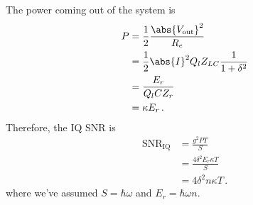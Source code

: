 The power coming out of the system is
\begin{align}
  P
  &= \frac{1}{2} \frac{\abs{V_\text{out}}^2}{R_e} \nonumber \\
  &= \frac{1}{2} \abs{I}^2 Q_l Z_{LC} \frac{1}{1 + \delta^2} \nonumber \\
  &= \frac{E_r}{Q_l C Z_r} \nonumber \\
  &= \kappa E_r \, .
\end{align}
Therefore, the IQ SNR is
\begin{align}
  \text{SNR}_\text{IQ}
  &= \frac{g^2 PT}{S} \nonumber \\
  &= \frac{4 \delta^2 E_r \kappa T}{S} \nonumber \\
  &= 4 \delta^2 n \kappa T \,.
\end{align}
where we've assumed $S=\hbar \omega$ and $E_r = \hbar \omega n$.
